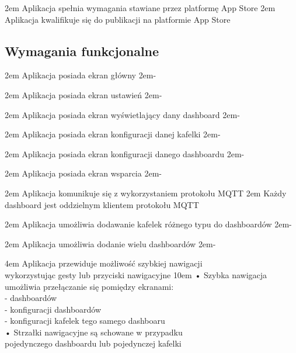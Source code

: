 {2em}{
    Aplikacja spełnia wymagania stawiane przez platformę App Store
}
{2em}{
    Aplikacja kwalifikuje się do publikacji na platformie App Store
}

\newpage

\subsection{Wymagania funkcjonalne}{}

{2em}{
    Aplikacja posiada ekran główny
}
{2em}{-}

{2em}{
    Aplikacja posiada ekran ustawień
}
{2em}{-}

{2em}{
    Aplikacja posiada ekran wyświetlający dany dashboard
}
{2em}{-}

{2em}{
    Aplikacja posiada ekran konfiguracji danej kafelki
}
{2em}{-}

{2em}{
    Aplikacja posiada ekran konfiguracji danego dashboardu
}
{2em}{-}

{2em}{
    Aplikacja posiada ekran wsparcia
}
{2em}{-}

{2em}{
    Aplikacja komunikuje się z wykorzystaniem protokołu MQTT
}
{2em}{
    Każdy dashboard jest oddzielnym klientem protokołu MQTT
}

{2em}{
    Aplikacja umożliwia dodawanie kafelek różnego typu do dashboardów
}
{2em}{-}

{2em}{
    Aplikacja umożliwia dodanie wielu dashboardów
}
{2em}{-}

{4em}{
    Aplikacja przewiduje możliwość szybkiej nawigacji\\
    wykorzystując gesty lub przyciski nawigacyjne
}
{10em}{
    • Szybka nawigacja umożliwia przełączanie się pomiędzy ekranami:\\
    - dashboardów\\
    - konfiguracji dashboardów\\
    - konfiguracji kafelek tego samego dashboaru\\

    • Strzałki nawigacyjne są schowane w przypadku\\
    \hspace*{0.5em} pojedynczego dashboardu lub pojedynczej kafelki
}

